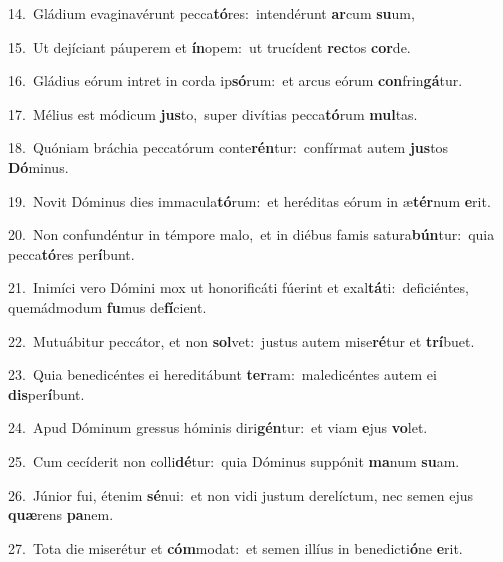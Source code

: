 {\numbfont\textcolor{\numbcolor}{14.}}~Gládium evaginavérunt pecca\-\textbf{tó}\-res:~\star intendérunt \textbf{ar}\-cum \textbf{su}\-um,\par
{\numbfont\textcolor{\numbcolor}{15.}}~Ut dejíciant páuperem et \textbf{ín}\-opem:~\star ut trucídent \textbf{rec}\-tos \textbf{cor}\-de.\par
{\numbfont\textcolor{\numbcolor}{16.}}~Gládius eórum intret in corda ip\-\textbf{só}\-rum:~\star et arcus eórum \textbf{con}\-frin\-\textbf{gá}\-tur.\par
{\numbfont\textcolor{\numbcolor}{17.}}~Mélius est módicum \textbf{jus}\-to,~\star super divítias pecca\-\textbf{tó}\-rum \textbf{mul}\-tas.\par
{\numbfont\textcolor{\numbcolor}{18.}}~Quóniam bráchia peccatórum conte\-\textbf{rén}\-tur:~\star confírmat autem \textbf{jus}\-tos \textbf{Dó}\-minus.\par
{\numbfont\textcolor{\numbcolor}{19.}}~Novit Dóminus dies immacula\-\textbf{tó}\-rum:~\star et heréditas eórum in æ\-\textbf{tér}\-num \textbf{e}\-rit.\par
{\numbfont\textcolor{\numbcolor}{20.}}~Non confundéntur in témpore malo,~\dagger et in diébus famis satura\-\textbf{bún}\-tur:~\star quia pecca\-\textbf{tó}\-res per\-\textbf{í}\-bunt.\par
{\numbfont\textcolor{\numbcolor}{21.}}~Inimíci vero Dómini mox ut honorificáti fúerint et exal\-\textbf{tá}\-ti:~\star deficiéntes, quemádmodum \textbf{fu}\-mus de\-\textbf{fí}\-cient.\par
{\numbfont\textcolor{\numbcolor}{22.}}~Mutuábitur peccátor, et non \textbf{sol}\-vet:~\star justus autem mise\-\textbf{ré}\-tur et \textbf{trí}\-buet.\par
{\numbfont\textcolor{\numbcolor}{23.}}~Quia benedicéntes ei hereditábunt \textbf{ter}\-ram:~\star maledicéntes autem ei \textbf{dis}\-per\-\textbf{í}\-bunt.\par
{\numbfont\textcolor{\numbcolor}{24.}}~Apud Dóminum gressus hóminis diri\-\textbf{gén}\-tur:~\star et viam \textbf{e}\-jus \textbf{vo}\-let.\par
{\numbfont\textcolor{\numbcolor}{25.}}~Cum cecíderit non colli\-\textbf{dé}\-tur:~\star quia Dóminus suppónit \textbf{ma}\-num \textbf{su}\-am.\par
{\numbfont\textcolor{\numbcolor}{26.}}~Júnior fui, étenim \textbf{sé}\-nui:~\star et non vidi justum derelíctum, nec semen ejus \textbf{quæ}\-rens \textbf{pa}\-nem.\par
{\numbfont\textcolor{\numbcolor}{27.}}~Tota die miserétur et \textbf{cóm}\-modat:~\star et semen illíus in benedicti\-\textbf{ó}\-ne \textbf{e}\-rit.\par
